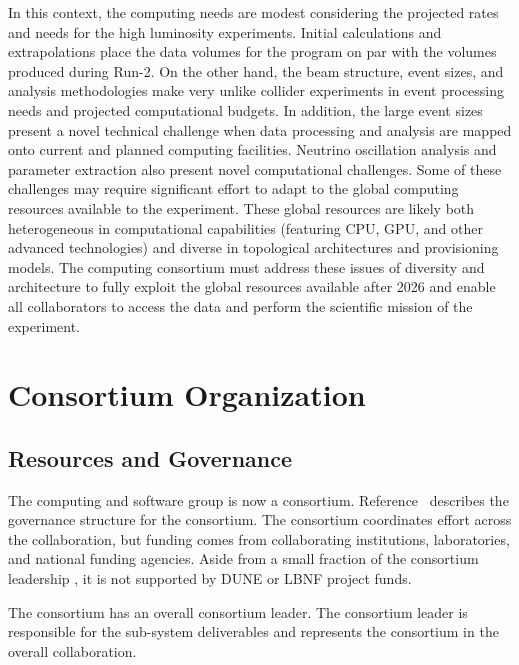 In this context, the  computing needs are modest considering the projected rates and needs for the high luminosity  experiments.  Initial calculations and extrapolations place the data volumes for the   program on par with the volumes produced during  Run-2.  On the other hand, the  beam structure, event sizes, and analysis methodologies make  very unlike collider experiments in event processing needs and projected computational budgets.  In addition, the large  event sizes present a novel technical challenge when data processing and analysis are mapped onto  current and planned computing facilities.  Neutrino oscillation analysis and parameter extraction also present novel computational challenges.   Some of these challenges may require significant effort to adapt to the global computing resources available to the experiment.  These global resources are likely both heterogeneous in computational capabilities (featuring CPU, GPU, and other advanced technologies) and diverse in topological architectures and provisioning models.  The  computing consortium must address these issues of diversity and architecture to fully exploit the global resources available after 2026 and enable all collaborators to access the data and perform the scientific mission of the experiment.  


\section{Consortium Organization}



\subsection{Resources and Governance}
\label{ch:exec-comp-gov}

The computing and software group is now a  consortium.  Reference~\cite{bib:docdb12751} describes the governance structure for the consortium.  The consortium coordinates effort across the collaboration, but funding comes from collaborating institutions, laboratories, and national funding agencies. Aside from a small fraction of the consortium leadership , it is not supported by DUNE or LBNF project funds.  

The consortium has an overall consortium leader. The consortium leader is responsible for the sub-system deliverables and represents the consortium in the overall  collaboration.

